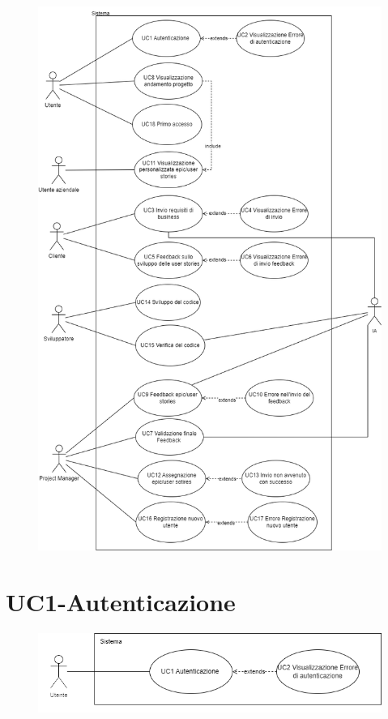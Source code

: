 \documentclass{article}
\begin{document}
\newpage
\begin{figure}[h]
    \centering
    \includegraphics[height = 0.75\textheight]{documenti/imgUML/UML.png}
    \label{fig:immagine}
\end{figure}
\newpage

\section{UC1-Autenticazione}
    \begin{figure}[h]
      \centering
      \includegraphics{documenti/imgUML/UC1.png}
      \label{fig:immagine}
    \end{figure} 
    
\end{document}
